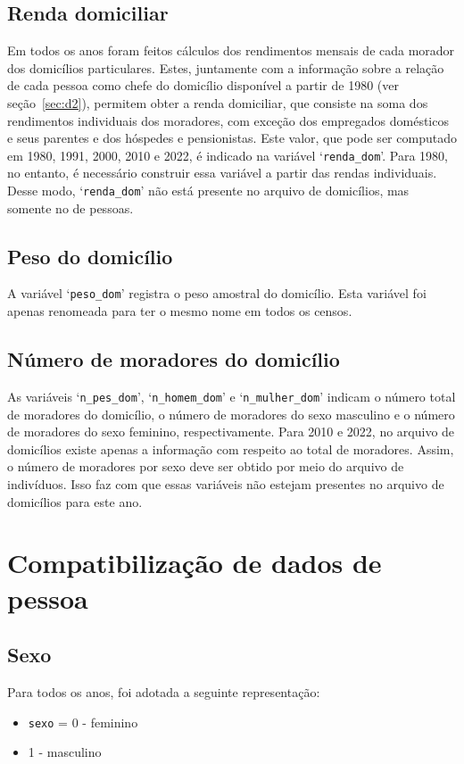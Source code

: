 \documentclass[12pt,a4paper]{article}
\newcommand{\vr}[1]{\texttt{#1}}
\begin{document}
\subsection{Renda domiciliar}\label{sec:c13}
Em todos os anos foram feitos cálculos dos rendimentos mensais de cada morador dos domicílios particulares. Estes, juntamente com a informação sobre a relação de cada pessoa como chefe do domicílio disponível a partir de 1980 (ver seção~\ref{sec:d2}), permitem obter a renda domiciliar, que consiste na soma dos rendimentos individuais dos moradores, com exceção dos empregados domésticos e seus parentes e dos hóspedes e pensionistas. Este valor, que pode ser computado em 1980, 1991, 2000, 2010 e 2022, é indicado na variável ‘\vr{renda\_dom}’. Para 1980, no entanto, é necessário construir essa variável a partir das rendas individuais. Desse modo, ‘\vr{renda\_dom}’ não está presente no arquivo de domicílios, mas somente no de pessoas.

\subsection{Peso do domicílio}\label{sec:c14}
A variável ‘\vr{peso\_dom}’ registra o peso amostral do domicílio. Esta variável foi apenas renomeada para ter o mesmo nome em todos os censos.

\subsection{Número de moradores do domicílio}\label{sec:c15}
As variáveis ‘\vr{n\_pes\_dom}’, ‘\vr{n\_homem\_dom}’ e ‘\vr{n\_mulher\_dom}’ indicam o número total de moradores do domicílio, o número de moradores do sexo masculino e o número de moradores do sexo feminino, respectivamente. Para 2010 e 2022, no arquivo de domicílios existe apenas a informação com respeito ao total de moradores. Assim, o número de moradores por sexo deve ser obtido por meio do arquivo de indivíduos. Isso faz com que essas variáveis não estejam presentes no arquivo de domicílios para este ano.

\section{Compatibilização de dados de pessoa}

\subsection{Sexo}\label{sec:d1}
Para todos os anos, foi adotada a seguinte representação:
\begin{itemize}
  \item \vr{sexo} = 0 - feminino
  \item 1 - masculino
\end{itemize}
\end{document}
